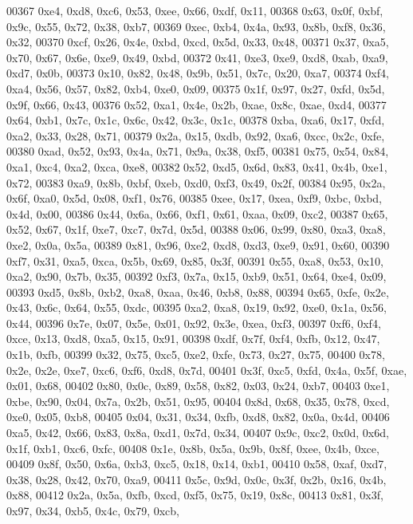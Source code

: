 \begin{DoxyCode}
00367   0xe4, 0xd8, 0xc6, 0x53, 0xee, 0x66, 0xdf, 0x11,
00368   0x63, 0x0f, 0xbf, 0x9c, 0x55, 0x72, 0x38, 0xb7,
00369   0xec, 0xb4, 0x4a, 0x93, 0x8b, 0xf8, 0x36, 0x32,
00370   0xcf, 0x26, 0x4e, 0xbd, 0xcd, 0x5d, 0x33, 0x48,
00371   0x37, 0xa5, 0x70, 0x67, 0x6e, 0xe9, 0x49, 0xbd,
00372   0x41, 0xe3, 0xe9, 0xd8, 0xab, 0xa9, 0xd7, 0x0b,
00373   0x10, 0x82, 0x48, 0x9b, 0x51, 0x7c, 0x20, 0xa7,
00374   0xf4, 0xa4, 0x56, 0x57, 0x82, 0xb4, 0xe0, 0x09,
00375   0x1f, 0x97, 0x27, 0xfd, 0x5d, 0x9f, 0x66, 0x43,
00376   0x52, 0xa1, 0x4e, 0x2b, 0xae, 0x8c, 0xae, 0xd4,
00377   0x64, 0xb1, 0x7c, 0x1c, 0x6c, 0x42, 0x3c, 0x1c,
00378   0xba, 0xa6, 0x17, 0xfd, 0xa2, 0x33, 0x28, 0x71,
00379   0x2a, 0x15, 0xdb, 0x92, 0xa6, 0xcc, 0x2c, 0xfe,
00380   0xad, 0x52, 0x93, 0x4a, 0x71, 0x9a, 0x38, 0xf5,
00381   0x75, 0x54, 0x84, 0xa1, 0xc4, 0xa2, 0xca, 0xe8,
00382   0x52, 0xd5, 0x6d, 0x83, 0x41, 0x4b, 0xe1, 0x72,
00383   0xa9, 0x8b, 0xbf, 0xeb, 0xd0, 0xf3, 0x49, 0x2f,
00384   0x95, 0x2a, 0x6f, 0xa0, 0x5d, 0x08, 0xf1, 0x76,
00385   0xee, 0x17, 0xea, 0xf9, 0xbc, 0xbd, 0x4d, 0x00,
00386   0x44, 0x6a, 0x66, 0xf1, 0x61, 0xaa, 0x09, 0xc2,
00387   0x65, 0x52, 0x67, 0x1f, 0xe7, 0xc7, 0x7d, 0x5d,
00388   0x06, 0x99, 0x80, 0xa3, 0xa8, 0xe2, 0x0a, 0x5a,
00389   0x81, 0x96, 0xe2, 0xd8, 0xd3, 0xe9, 0x91, 0x60,
00390   0xf7, 0x31, 0xa5, 0xca, 0x5b, 0x69, 0x85, 0x3f,
00391   0x55, 0xa8, 0x53, 0x10, 0xa2, 0x90, 0x7b, 0x35,
00392   0xf3, 0x7a, 0x15, 0xb9, 0x51, 0x64, 0xe4, 0x09,
00393   0xd5, 0x8b, 0xb2, 0xa8, 0xaa, 0x46, 0xb8, 0x88,
00394   0x65, 0xfe, 0x2e, 0x43, 0x6c, 0x64, 0x55, 0xdc,
00395   0xa2, 0xa8, 0x19, 0x92, 0xe0, 0x1a, 0x56, 0x44,
00396   0x7e, 0x07, 0x5e, 0x01, 0x92, 0x3e, 0xea, 0xf3,
00397   0xf6, 0xf4, 0xce, 0x13, 0xd8, 0xa5, 0x15, 0x91,
00398   0xdf, 0x7f, 0xf4, 0xfb, 0x12, 0x47, 0x1b, 0xfb,
00399   0x32, 0x75, 0xc5, 0xe2, 0xfe, 0x73, 0x27, 0x75,
00400   0x78, 0x2e, 0x2e, 0xe7, 0xc6, 0xf6, 0xd8, 0x7d,
00401   0x3f, 0xc5, 0xfd, 0x4a, 0x5f, 0xae, 0x01, 0x68,
00402   0x80, 0x0c, 0x89, 0x58, 0x82, 0x03, 0x24, 0xb7,
00403   0xe1, 0xbe, 0x90, 0x04, 0x7a, 0x2b, 0x51, 0x95,
00404   0x8d, 0x68, 0x35, 0x78, 0xcd, 0xe0, 0x05, 0xb8,
00405   0x04, 0x31, 0x34, 0xfb, 0xd8, 0x82, 0x0a, 0x4d,
00406   0xa5, 0x42, 0x66, 0x83, 0x8a, 0xd1, 0x7d, 0x34,
00407   0x9c, 0xc2, 0x0d, 0x6d, 0x1f, 0xb1, 0xc6, 0xfc,
00408   0x1e, 0x8b, 0x5a, 0x9b, 0x8f, 0xee, 0x4b, 0xce,
00409   0x8f, 0x50, 0x6a, 0xb3, 0xc5, 0x18, 0x14, 0xb1,
00410   0x58, 0xaf, 0xd7, 0x38, 0x28, 0x42, 0x70, 0xa9,
00411   0x5c, 0x9d, 0x0c, 0x3f, 0x2b, 0x16, 0x4b, 0x88,
00412   0x2a, 0x5a, 0xfb, 0xcd, 0xf5, 0x75, 0x19, 0x8c,
00413   0x81, 0x3f, 0x97, 0x34, 0xb5, 0x4c, 0x79, 0xcb,

\end{DoxyCode}
